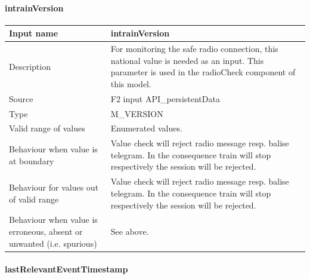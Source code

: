 \paragraph{intrainVersion}

\begin{longtable}{p{}p{}}
\toprule
Input name				& intrainVersion \\
\midrule
Description				& For monitoring the safe radio connection, this national value is needed as an input. This parameter is used in the radioCheck component of this model. \\
\midrule
Source					& F2 input API\_persistentData\\ 
\midrule
Type					& M\_VERSION \\
\midrule
Valid range of values	& Enumerated values.\\
\midrule
Behaviour when value is at boundary	& Value check will reject radio message resp. balise telegram. In the consequence train will stop respectively the session will be rejected. \\
\midrule
Behaviour for values out of valid range	& Value check will reject radio message resp. balise telegram. In the consequence train will stop respectively the session will be rejected.\\
\midrule
Behaviour when value is erroneous, absent or unwanted (i.e. spurious) & See above. \\
\bottomrule
\end{longtable}


\paragraph{lastRelevantEventTimestamp}

